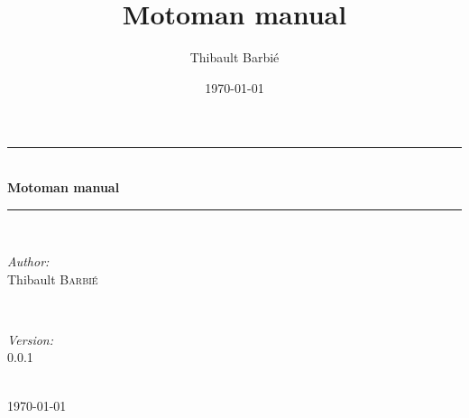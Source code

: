 \documentclass{article}
\title{Motoman manual}
\author{Thibault Barbié}
\date{\today}
\begin{document}
\begin{titlepage}
\newcommand{\HRule}{\rule{\linewidth}{0.5mm}}
\center

\HRule \\[1.5cm]
{ \huge \bfseries Motoman manual}\\[0.4cm] 
\HRule \\[1.5cm]

\begin{minipage}{0.4\textwidth}
\begin{flushleft} \large
\emph{Author:}\\
Thibault \textsc{Barbi\'{e}} %
\end{flushleft}
\end{minipage}
~
\begin{minipage}{0.4\textwidth}
\begin{flushright} \large
\emph{Version:}\\
0.0.1 %
\end{flushright}
\end{minipage}\\[4cm]

{\large \today}\\[3cm] 
\vfill 

\end{titlepage}

\tableofcontents
\newpage


\newpage

\newpage

\end{document}
